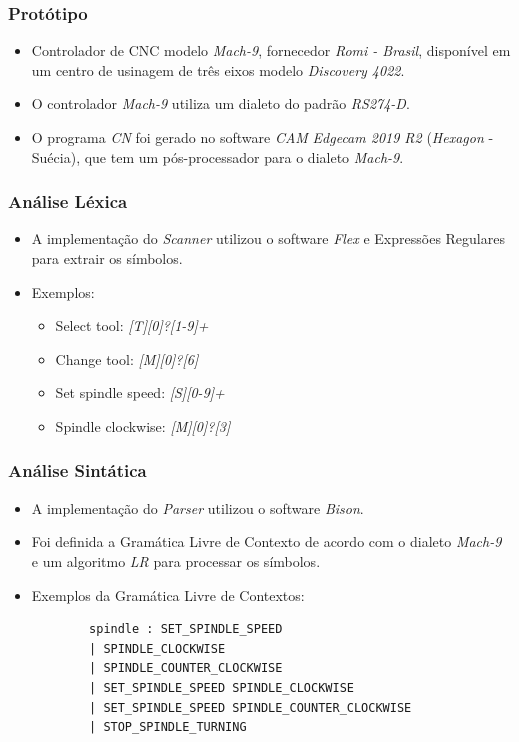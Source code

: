 \documentclass[aspectratio=169]{beamer}
\begin{document}
{\begin{frame}
  \frametitle{Protótipo}

  \begin{itemize}
    \item Controlador de CNC modelo \emph{Mach-9}, fornecedor 
          \emph{Romi - Brasil}, disponível em um centro de usinagem de
           três eixos modelo \emph{Discovery 4022}.
    \item O controlador \emph{Mach-9} utiliza um dialeto do padrão 
          \emph{RS274-D}.
    \item O programa \emph{CN} foi gerado no software \emph{CAM} 
          \emph{Edgecam 2019 R2} (\emph{Hexagon} - Suécia), que tem um 
          pós-processador para o dialeto \emph{Mach-9}.
  \end{itemize}

\end{frame}


\begin{frame}
  \frametitle{Análise Léxica}
  \begin{itemize}
    \item A implementação do \emph{Scanner} utilizou o software 
          \emph{Flex} e Expressões Regulares para extrair os símbolos.
    \item Exemplos:
      \begin{itemize}
        \item Select tool: \emph{[T][0]?[1-9]+}
        \item Change tool: \emph{[M][0]?[6]}
        \item Set spindle speed: \emph{[S][0-9]+}
        \item Spindle clockwise: \emph{[M][0]?[3]}
      \end{itemize}  
  \end{itemize}

\end{frame}


\begin{frame}[fragile]
  \frametitle{Análise Sintática}
  \begin{itemize}
    \item A implementação do \emph{Parser} utilizou o software 
          \emph{Bison}.
    \item Foi definida a Gramática Livre de Contexto de acordo com o 
          dialeto \emph{Mach-9} e um algoritmo \emph{LR}
          para processar os símbolos.
    \item Exemplos da Gramática Livre de Contextos:
      \begin{lstlisting}
        spindle : SET_SPINDLE_SPEED
        | SPINDLE_CLOCKWISE
        | SPINDLE_COUNTER_CLOCKWISE
        | SET_SPINDLE_SPEED SPINDLE_CLOCKWISE
        | SET_SPINDLE_SPEED SPINDLE_COUNTER_CLOCKWISE
        | STOP_SPINDLE_TURNING
      

\end{lstlisting}
\end{itemize}
\end{frame}}
\end{document}
